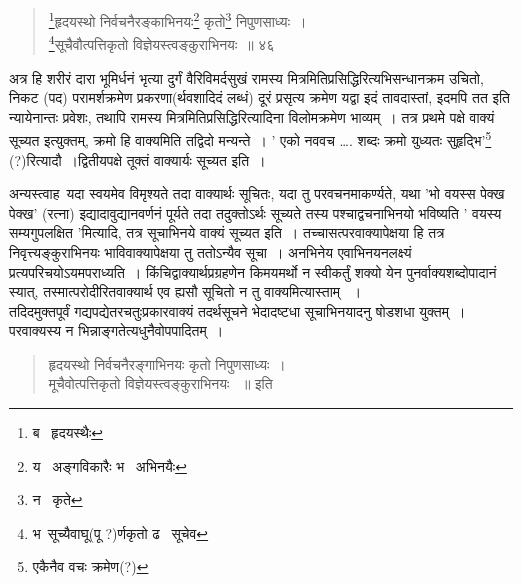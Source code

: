 \documentclass[11pt, openany]{book}
\begin{document}

\newpage

\lfoot{}
 
 \begin{quote}
 {\na \renewcommand{\thefootnote}{1}\footnote{ब \textendash\ हृदयस्थैः}हृदयस्थो निर्वचनैरङ्काभिनयः\renewcommand{\thefootnote}{2}\footnote{य \textendash\ अङ्गविकारैः भ \textendash\ अभिनयैः} कृतो\renewcommand{\thefootnote}{3}\footnote{न \textendash\ कृते} निपुणसाध्यः~। \\
\renewcommand{\thefootnote}{4}\footnote{भ\textendash\ सूच्यैवाघू(पू ?)र्णकृतो ढ \textendash\ सूचेव}सूचैवौत्पत्तिकृतो विज्ञेयस्त्वङ्कुराभिनयः~॥ ४६ }
 \end{quote}

\begin{sloppypar}
अत्र हि शरीरं दारा भूमिर्धनं भृत्या दुर्गं वैरिविमर्दसुखं रामस्य मित्रमितिप्रसिद्धिरित्यभिसन्धानक्रम उचितो, निकट (पद) परामर्शक्रमेण प्रकरणा(र्थवशादिदं लब्धं) दूरं प्रसृत्य क्रमेण यद्वा इदं तावदास्तां, इदमपि तत इति न्यायेनान्तः प्रवेशः, तथापि रामस्य मित्रमितिप्रसिद्धिरित्यादिना विलोमक्रमेण भाव्यम्~। तत्र प्रथमे पक्षे वाक्यं सूच्यत इत्युक्तम्, क्रमो हि वाक्यमिति तद्विदो मन्यन्ते~। ' एको नववच \ldots . शब्दः क्रमो युध्यतः सुहृद्भि'\renewcommand{\thefootnote}{*}\footnote{एकैनैव वचः क्रमेण(?) } (?)रित्यादौ~।द्वितीयपक्षे तूक्तं वाक्यार्यः सूच्यत इति~।\\ 
\end{sloppypar}

अन्यस्त्वाह\textendash\ यदा स्वयमेव विमृश्यते तदा वाक्यार्थः सूचितः, यदा तु परवचनमाकर्ण्यते, यथा 'भो वयस्स पेक्ख पेक्ख' (रत्ना) इद्यादावुद्यानवर्णनं पूर्यते तदा तदुक्तोऽर्थः सूच्यते तस्य पश्चाद्वचनाभिनयो भविष्यति ' वयस्य सम्यगुपलक्षित 'मित्यादि, तत्र सूचाभिनये वाक्यं सूच्यत इति~। तच्चासत्परवाक्यापेक्षया हि तत्र निवृत्त्यङ्कुराभिनयः भाविवाक्यापेक्षया तु ततोऽन्यैव सूचा~। अनभिनेय एवाभिनयनलक्ष्यं प्रत्यपरिचयोऽयमपराध्यति~। किंचिद्वाक्यार्थप्रग्रहणेन किमयमर्थो न स्वीकर्तुं शक्यो येन पुनर्वाक्यशब्दोपादानं स्यात्, तस्मात्परोदीरितवाक्यार्थ एव ह्यसौ सूचितो न तु वाक्यमित्यास्ताम् ~। \\

तदिदमुक्तपूर्वं गद्यपद्येतरचतुःप्रकारवाक्यं तदर्थसूचने भेदादष्टधा सूचाभिनयादनु षोडशधा युक्तम्~। परवाक्यस्य न भिन्नाङ्गतेत्यधुनैवोपपादितम्~। 

\begin{quote}
 {\qt हृदयस्थो निर्वचनैरङ्गाभिनयः कृतो निपुणसाध्यः~। \\
मूचैवोत्पत्तिकृतो विज्ञेयस्त्वङ्कुराभिनयः ~॥ इति }
\end{quote}
\end{document}
